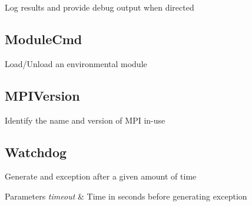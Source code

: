 Log results and provide debug output when directed\hypertarget{group___utilities_ModuleCmd}{}\subsection{Module\-Cmd}\label{group___utilities_ModuleCmd}
Load/\-Unload an environmental module\hypertarget{group___utilities_MPIVersion}{}\subsection{M\-P\-I\-Version}\label{group___utilities_MPIVersion}
Identify the name and version of M\-P\-I in-\/use\hypertarget{group___utilities_Watchdog}{}\subsection{Watchdog}\label{group___utilities_Watchdog}
Generate and exception after a given amount of time 
\begin{DoxyParams}{Parameters}
{\em timeout} & Time in seconds before generating exception \\
\hline
\end{DoxyParams}
